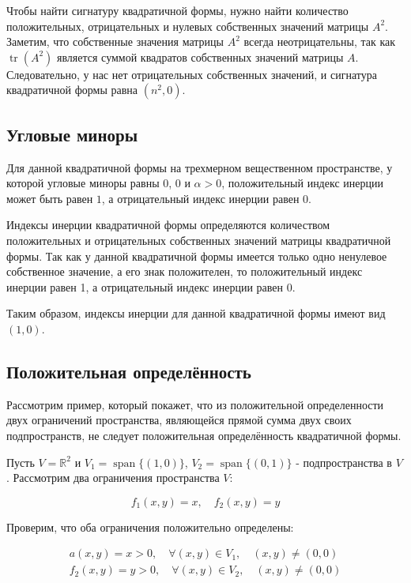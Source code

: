 Чтобы найти сигнатуру квадратичной формы, нужно найти количество положительных, отрицательных и нулевых собственных
значений матрицы $A^2$.
Заметим, что собственные значения матрицы $A^2$ всегда неотрицательны, так как $\operatorname{tr}(A^2)$ является
суммой квадратов собственных значений матрицы $A$.
Следовательно, у нас нет отрицательных собственных значений, и сигнатура квадратичной формы равна $(n^2, 0)$.

 \subsection*{Угловые миноры}

Для данной квадратичной формы на трехмерном вещественном пространстве, у которой угловые миноры равны $0$, $0$ и
$\alpha > 0$, положительный индекс инерции может быть равен $1$, а отрицательный индекс инерции равен $0$.

Индексы инерции квадратичной формы определяются количеством положительных и отрицательных собственных значений
матрицы квадратичной формы.
Так как у данной квадратичной формы имеется только одно ненулевое собственное значение, а его знак положителен, то
положительный индекс инерции равен 1, а отрицательный индекс инерции равен 0.

Таким образом, индексы инерции для данной квадратичной формы имеют вид $(1,0)$.

 \subsection*{Положительная определённость}

Рассмотрим пример, который покажет, что из положительной определенности двух ограничений пространства, являющейся
прямой сумма двух своих подпространств, не следует положительная определённость квадратичной формы.

Пусть $V = \mathbb{R}^2$ и $V_1 = \operatorname{span}\{(1,0)\}$, $V_2 = \operatorname{span}\{(0,1)\}$ - подпространства в $V$.
Рассмотрим два ограничения пространства $V$:

\[ f_1(x,y) = x, \quad f_2(x,y) = y \]

Проверим, что оба ограничения положительно определены:

\begin{gather*}
    a(x,y) = x > 0, \quad \forall (x,y) \in V_1, \quad (x,y) \neq (0,0)\\
    f_2(x,y) = y > 0, \quad \forall (x,y) \in V_2, \quad (x,y) \neq (0,0)\\
\end{gather*}

